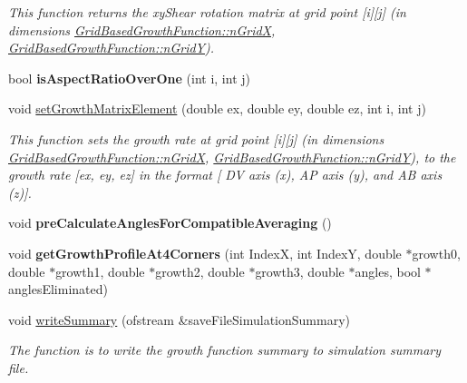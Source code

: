 \begin{DoxyCompactItemize}
\begin{DoxyCompactList}\small\item\em This function returns the xy\+Shear rotation matrix at grid point \mbox{[}i\mbox{]}\mbox{[}j\mbox{]} (in dimensions \hyperlink{classGridBasedGrowthFunction_af872b9963f3a579dcd615c23bcb58a86}{Grid\+Based\+Growth\+Function\+::n\+Grid\+X}, \hyperlink{classGridBasedGrowthFunction_a625bc963a1f1e7d1f1a35dbd0ef51728}{Grid\+Based\+Growth\+Function\+::n\+Grid\+Y}). \end{DoxyCompactList}\item 
\hypertarget{classGridBasedGrowthFunction_ab07937a18f72f31f4875225c1e246032}{}bool {\bfseries is\+Aspect\+Ratio\+Over\+One} (int i, int j)\label{classGridBasedGrowthFunction_ab07937a18f72f31f4875225c1e246032}

\item 
\hypertarget{classGridBasedGrowthFunction_a9d01fcbba5732aad966659d4f64c145b}{}void \hyperlink{classGridBasedGrowthFunction_a9d01fcbba5732aad966659d4f64c145b}{set\+Growth\+Matrix\+Element} (double ex, double ey, double ez, int i, int j)\label{classGridBasedGrowthFunction_a9d01fcbba5732aad966659d4f64c145b}

\begin{DoxyCompactList}\small\item\em This function sets the growth rate at grid point \mbox{[}i\mbox{]}\mbox{[}j\mbox{]} (in dimensions \hyperlink{classGridBasedGrowthFunction_af872b9963f3a579dcd615c23bcb58a86}{Grid\+Based\+Growth\+Function\+::n\+Grid\+X}, \hyperlink{classGridBasedGrowthFunction_a625bc963a1f1e7d1f1a35dbd0ef51728}{Grid\+Based\+Growth\+Function\+::n\+Grid\+Y}), to the growth rate \mbox{[}ex, ey, ez\mbox{]} in the format \mbox{[} D\+V axis (x), A\+P axis (y), and A\+B axis (z)\mbox{]}. \end{DoxyCompactList}\item 
\hypertarget{classGridBasedGrowthFunction_a92f4db6ab17ba3539f98895c500ec2d7}{}void {\bfseries pre\+Calculate\+Angles\+For\+Compatible\+Averaging} ()\label{classGridBasedGrowthFunction_a92f4db6ab17ba3539f98895c500ec2d7}

\item 
\hypertarget{classGridBasedGrowthFunction_a11692e47b20e812fe775f99a78480571}{}void {\bfseries get\+Growth\+Profile\+At4\+Corners} (int Index\+X, int Index\+Y, double $\ast$growth0, double $\ast$growth1, double $\ast$growth2, double $\ast$growth3, double $\ast$angles, bool $\ast$angles\+Eliminated)\label{classGridBasedGrowthFunction_a11692e47b20e812fe775f99a78480571}

\item 
void \hyperlink{classGridBasedGrowthFunction_a267f45c300d9ef98c6f4fa14a5181c78}{write\+Summary} (ofstream \&save\+File\+Simulation\+Summary)
\begin{DoxyCompactList}\small\item\em The function is to write the growth function summary to simulation summary file. \end{DoxyCompactList}\end{DoxyCompactItemize}
